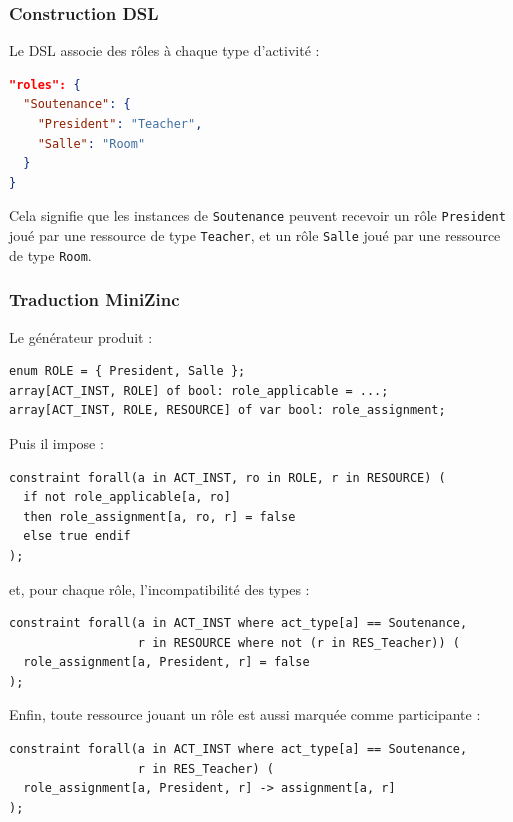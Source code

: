 \documentclass[12pt,a4paper]{article}
\begin{document}
\subsubsection*{Construction DSL}

Le DSL associe des rôles à chaque type d'activité :

\begin{lstlisting}[language=JSON]
"roles": {
  "Soutenance": {
    "President": "Teacher",
    "Salle": "Room"
  }
}
\end{lstlisting}

Cela signifie que les instances de \texttt{Soutenance} peuvent recevoir un rôle \texttt{President} joué par une ressource de type \texttt{Teacher}, et un rôle \texttt{Salle} joué par une ressource de type \texttt{Room}.

\subsubsection*{Traduction MiniZinc}

Le générateur produit :

\begin{lstlisting}[language=MiniZinc]
enum ROLE = { President, Salle };
array[ACT_INST, ROLE] of bool: role_applicable = ...;
array[ACT_INST, ROLE, RESOURCE] of var bool: role_assignment;
\end{lstlisting}

Puis il impose :

\begin{lstlisting}[language=MiniZinc]
constraint forall(a in ACT_INST, ro in ROLE, r in RESOURCE) (
  if not role_applicable[a, ro]
  then role_assignment[a, ro, r] = false
  else true endif
);
\end{lstlisting}

et, pour chaque rôle, l'incompatibilité des types :

\begin{lstlisting}[language=MiniZinc]
constraint forall(a in ACT_INST where act_type[a] == Soutenance,
                  r in RESOURCE where not (r in RES_Teacher)) (
  role_assignment[a, President, r] = false
);
\end{lstlisting}

Enfin, toute ressource jouant un rôle est aussi marquée comme participante :

\begin{lstlisting}[language=MiniZinc]
constraint forall(a in ACT_INST where act_type[a] == Soutenance,
                  r in RES_Teacher) (
  role_assignment[a, President, r] -> assignment[a, r]
);
\end{lstlisting}
\end{document}
